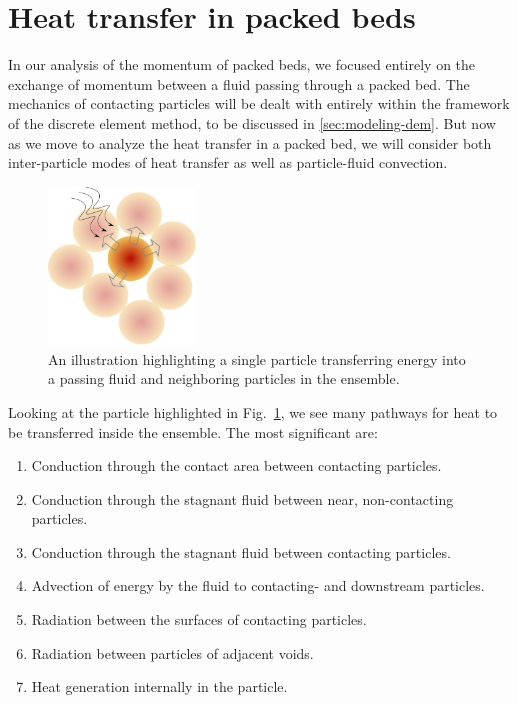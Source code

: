 \section{Heat transfer in packed beds} \label{sec:modeling-heat-transfer}
In our analysis of the momentum of packed beds, we focused entirely on the exchange of momentum between a fluid passing through a packed bed. The mechanics of contacting particles will be dealt with entirely within the framework of the discrete element method, to be discussed in \cref{sec:modeling-dem}. But now as we move to analyze the heat transfer in a packed bed, we will consider both inter-particle modes of heat transfer as well as particle-fluid convection. 


\begin{figure}[t]
	\centering
	\includegraphics[width=0.35\textwidth]{chapters/figures/pebble-complete-heat-transfer}
	\caption{An illustration highlighting a single particle transferring energy into a passing fluid and neighboring particles in the ensemble.}\label{fig:peb-comp-ht}
\end{figure}

Looking at the particle highlighted in Fig.~\ref{fig:peb-comp-ht}, we see many pathways for heat to be transferred inside the ensemble. The most significant are:

\begin{enumerate}
\item Conduction through the contact area between contacting particles.
\item Conduction through the stagnant fluid between near, non-contacting particles.
\item Conduction through the stagnant fluid between contacting particles.
\item Advection of energy by the fluid to contacting- and downstream particles.
\item Radiation between the surfaces of contacting particles.
\item Radiation between particles of adjacent voids.
\item Heat generation internally in the particle.
\end{enumerate}

